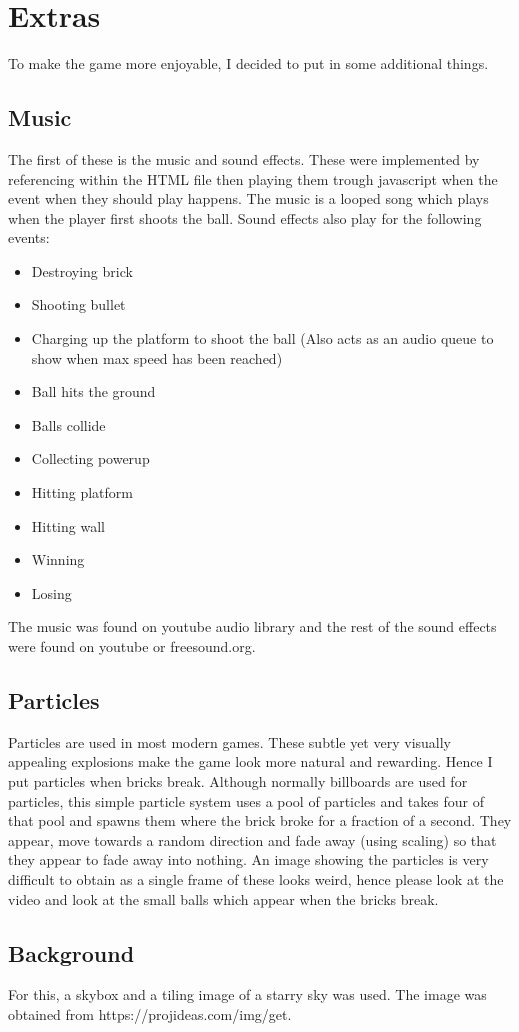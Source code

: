 \chapter{Extras}
To make the game more enjoyable, I decided to put in some additional things.

\section{Music}
The first of these is the music and sound effects. These were implemented by referencing within the HTML file then playing them trough javascript when the event when they should play happens. The music is a looped song which plays when the player first shoots the ball. Sound effects also play for the following events:
\begin{itemize}
	\item Destroying brick
	\item Shooting bullet
	\item Charging up the platform to shoot the ball (Also acts as an audio queue to show when max speed has been reached)
	\item Ball hits the ground
	\item Balls collide
	\item Collecting powerup
	\item Hitting platform
	\item Hitting wall
	\item Winning
	\item Losing
\end{itemize}
The music was found on youtube audio library and the rest of the sound effects were found on youtube or freesound.org.

\section{Particles}
Particles are used in most modern games. These subtle yet very visually appealing explosions make the game look more natural and rewarding. Hence I put particles when bricks break. Although normally billboards are used for particles, this simple particle system uses a pool of particles and takes four of that pool and spawns them where the brick broke for a fraction of a second. They appear, move towards a random direction and fade away (using scaling) so that they appear to fade away into nothing. An image showing the particles is very difficult to obtain as a single frame of these looks weird, hence please look at the video and look at the small balls which appear when the bricks break.

\section{Background}
For this, a skybox and a tiling image of a starry sky was used. The image was obtained from https://projideas.com/img/get.
